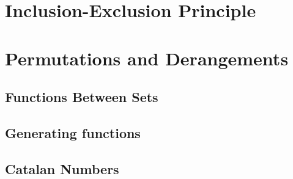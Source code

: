 \section{Inclusion-Exclusion Principle}
\begingroup
  \let\maketitle\relax
  
\endgroup


\section{Permutations and Derangements}
\begingroup
  \renewcommand{\section}{\subsection}
  
\endgroup


\section{Functions Between Sets}
\begingroup
  \let\maketitle\relax
  
\endgroup

\section{Generating functions}
\begingroup
  \renewcommand{\section}{\subsection}
  
\endgroup





\section{Catalan Numbers}
\begingroup
  \renewcommand{\section}{\subsection}
  
\endgroup

